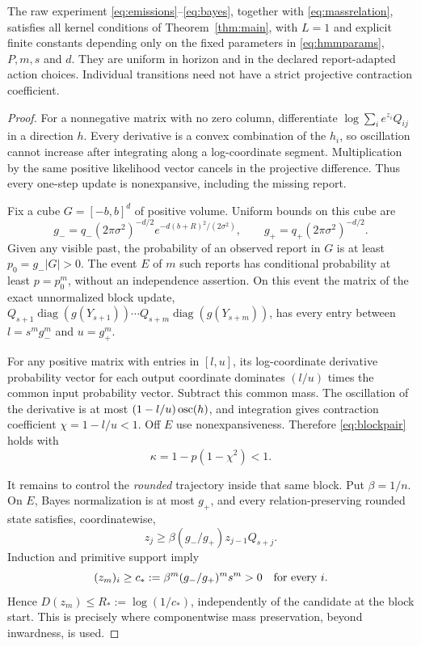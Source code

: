\begin{lemma}\label{lem:hmmraw}
The raw experiment \eqref{eq:emissions}--\eqref{eq:bayes}, together with \eqref{eq:massrelation}, satisfies all kernel conditions of Theorem~\ref{thm:main}, with $L=1$ and explicit finite constants depending only on the fixed parameters in \eqref{eq:hmmparams}, $P,m,s$ and $d$. They are uniform in horizon and in the declared report-adapted action choices. Individual transitions need not have a strict projective contraction coefficient.
\end{lemma}
\begin{proof}
For a nonnegative matrix with no zero column, differentiate $\log\sum_i e^{z_i}Q_{ij}$ in a direction $h$. Every derivative is a convex combination of the $h_i$, so oscillation cannot increase after integrating along a log-coordinate segment. Multiplication by the same positive likelihood vector cancels in the projective difference. Thus every one-step update is nonexpansive, including the missing report.

Fix a cube $G=[-b,b]^d$ of positive volume. Uniform bounds on this cube are
\[
 g_-=q_-(2\pi\sigma^2)^{-d/2}
       e^{-d(b+R)^2/(2\sigma^2)},\qquad
 g_+=q_+(2\pi\sigma^2)^{-d/2}.
\]
Given any visible past, the probability of an observed report in $G$ is at least $p_0=g_-\lvert G\rvert>0$. The event $E$ of $m$ such reports has conditional probability at least $p=p_0^m$, without an independence assertion. On this event the matrix of the exact unnormalized block update,
$Q_{s+1}\operatorname{diag}(g(Y_{s+1}))\cdots
Q_{s+m}\operatorname{diag}(g(Y_{s+m}))$,
has every entry between $l=s^m g_-^m$ and $u=g_+^m$.

For any positive matrix with entries in $[l,u]$, its log-coordinate derivative probability vector for each output coordinate dominates $(l/u)$ times the common input probability vector. Subtract this common mass. The oscillation of the derivative is at most $(1-l/u)\operatorname{osc}(h)$, and integration gives contraction coefficient $\chi=1-l/u<1$. Off $E$ use nonexpansiveness. Therefore \eqref{eq:blockpair} holds with
\begin{equation}\label{eq:hmmkappa}
 \kappa=1-p(1-\chi^2)<1.
\end{equation}

It remains to control the \emph{rounded} trajectory inside that same block. Put $\beta=1/n$. On $E$, Bayes normalization is at most $g_+$, and every relation-preserving rounded state satisfies, coordinatewise,
\[
 z_j\ge\beta(g_-/g_+)z_{j-1}Q_{s+j}.
\]
Induction and primitive support imply
\begin{equation}\label{eq:floor}
 (z_m)_i\ge c_*:=\beta^m(g_-/g_+)^m s^m>0
 \quad\hbox{for every }i.
\end{equation}
Hence $D(z_m)\le R_*:=\log(1/c_*)$, independently of the candidate at the block start. This is precisely where componentwise mass preservation, beyond inwardness, is used.


\end{proof}
